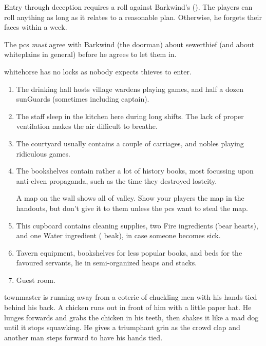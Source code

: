 \begin{multicols}{2}
Entry through deception requires a roll against Barkwind's  (\tn).
The players can roll anything as long as it relates to a reasonable plan.
Otherwise, he forgets their faces within a week.

The \glspl{pc} \emph{must} agree with Barkwind (the doorman) about \gls{sewerthief} (and about \gls{whiteplains} in general) before he agrees to let them in.

\Gls{whitehorse} has no locks as nobody expects thieves to enter.
 
\begin{enumerate}
  \item
  The drinking hall hosts \gls{village} \glspl{warden} playing games, and half a dozen \glspl{sunGuard} (sometimes including \gls{captain}).
  \label{horseHall}
  \item
  \label{horseKitch}
  The staff sleep in the kitchen here during long shifts.
  The lack of proper ventilation makes the air difficult to breathe.
  \item
  \label{horseYard}
  The courtyard usually contains a couple of carriages, and nobles playing ridiculous games.
  \item
  \label{horseUpstairs}
  The bookshelves contain rather a lot of history books, most focussing upon anti-elven propaganda, such as the time they destroyed \gls{lostcity}.

  A map on the wall shows all of \gls{valley}.
  Show your players the map in the handouts, but don't give it to them unless the \glspl{pc} want to steal the map.
  \item
  \label{horseCupboard}
  This cupboard contains cleaning supplies, two Fire \glspl{ingredient} (bear hearts), and one Water \gls{ingredient} ( beak), in case someone becomes sick.
  \item
  \label{horseSideRoom}
  Tavern equipment, bookshelves for less popular books, and beds for the favoured servants, lie in semi-organized heaps and stacks.
  \item
  \label{wolfRoom}
  Guest room.
\end{enumerate}

\begin{boxtext}
  \Gls{townmaster} is running away from a coterie of chuckling men with his hands tied behind his back.
   A chicken runs out in front of him with a little paper hat.
   He lunges forwards and grabs the chicken in his teeth, then shakes it like a mad dog until it stops squawking.
   He gives a triumphant grin as the crowd clap and another man steps forward to have his hands tied.
\end{boxtext}


\end{multicols}
